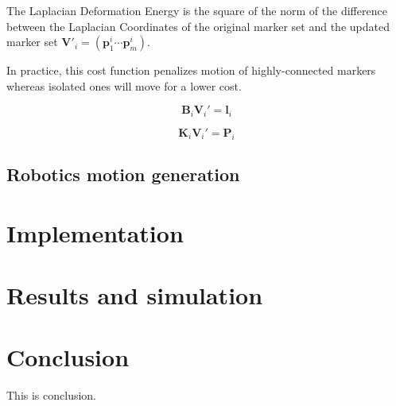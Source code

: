 \documentclass[letterpaper, 10 pt, conference]{ieeeconf}  %
\begin{document}
The Laplacian Deformation Energy is the square of the norm of the
difference between the Laplacian Coordinates of the original marker
set and the updated marker set $\mathbf{V}'_i = (\mathbf{p}^i_1 \cdots
\mathbf{p}^i_m)$.

In practice, this cost function penalizes motion of highly-connected
markers whereas isolated ones will move for a lower cost.


\begin{equation}
\mathbf{B}_i \mathbf{V}_i' = \mathbf{l}_i
\end{equation}


\begin{equation}
\mathbf{K}_i \mathbf{V}_i' = \mathbf{P}_i
\end{equation}


\subsection{Robotics motion generation}

\section{Implementation}
\label{sec:implementation}


\section{Results and simulation}
\label{sec:results}

\section{Conclusion}
\label{sec:conclusion}

This is conclusion.


\end{document}
